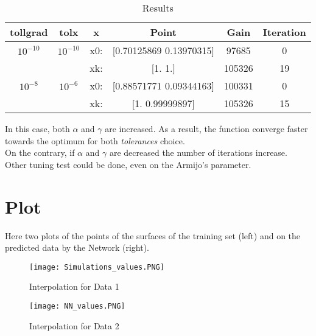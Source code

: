 \documentclass{article}
\begin{document}
\begin{table}[h!]
\centering
 \begin{tabular}{|c c c c c c|} 
 \hline
 tollgrad & tolx & x & Point & Gain & Iteration \\ [0.5ex] 
 \hline\hline

  $10^{-10}$ & $10^{-10}$ &  x0: &[0.70125869 0.13970315] & 97685 & 0 \\ 
  &  & xk: & [1. 1.] & 105326 & 19 \\
  \hline
   $10^{-8}$ & $10^{-6}$ & x0: &[0.88571771 0.09344163] & 100331 & 0 \\ 
  &  &xk: & [1.         0.99999897] & 105326 & 15 \\
 \hline
 \end{tabular}
 \caption{Results}
\label{table:2}
\end{table}
In this case, both $\alpha$ and $\gamma$ are increased. As a result, the function converge faster towards the optimum for both \emph{tolerances} choice.\\
On the contrary, if $\alpha$ and $\gamma$ are decreased the number of iterations increase.
\\
Other tuning test could be done, even on the Armijo's parameter.
\section{Plot}
Here two plots of the points of the surfaces of the training set (left) and on the predicted data by the Network (right).
\begin{figure}[!htb]
   \begin{minipage}{0.48\textwidth}
     \centering
     \texttt{[image: Simulations\_values.PNG]}
     \caption{Interpolation for Data 1}\label{Fig:Data1}
   \end{minipage}\hfill
   \begin{minipage}{0.48\textwidth}
     \centering
     \texttt{[image: NN\_values.PNG]}
     \caption{Interpolation for Data 2}\label{Fig:Data2}
   \end{minipage}
\end{figure}
\end{document}
